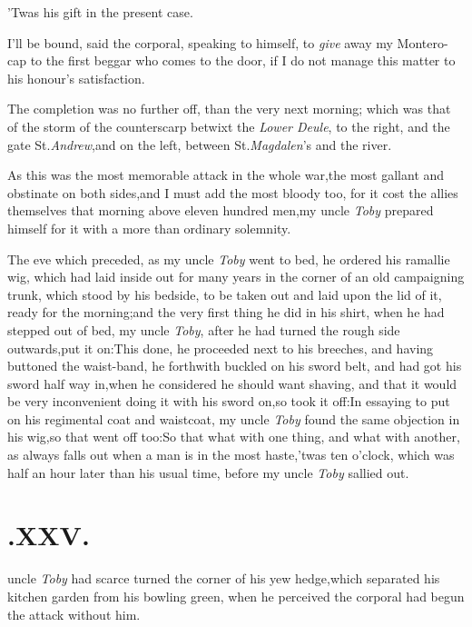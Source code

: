 \documentclass{article}
\begin{document}
\tsh ’Twas his gift in the present case.

I’ll be bound, said the corporal, speaking to himself, to
\textit{give} away my Montero-cap to the first beggar who comes to the door,
if I do not manage this matter to\break
his honour’s satisfaction.

The completion was no further off, than the very next morning; which was that of the
storm of the counterscarp betwixt the \textit{Lower Deule}, to the right, and the
gate St.\@ \textit{Andrew},\tsk and on the left, between St.\@ \textit{Magdalen}’s
and the river.

As this was the most memorable attack in the whole
war,\tsk the most gallant and obstinate on both sides,\tsk and
I must add the most bloody too, for it cost the allies themselves
that morning above eleven hundred men,\tsk my uncle \textit{Toby}
prepared himself for it with a more than ordinary solemnity.

The eve which preceded, as my uncle \textit{Toby} went to bed, he
ordered his ramallie wig, which had laid inside out for many years
in the corner of an old campaigning trunk, which stood by his
\setlength{\baselineskip}{13.3636pt}%
bedside, to be taken out and laid upon the lid of it, ready for the morning;\tsk and the
very first thing he did in his shirt, when he had stepped out of
bed, my uncle \textit{Toby}, after he had turned the rough side
outwards,\tsk put it on:\tsh\break This done, he proceeded
next to his breeches, and having buttoned the waist-band, he
forthwith buckled on his sword belt, and had got his sword half way
in,\break\tsk when he considered he should want shaving, and that it
would be very inconvenient doing it with his sword on,\tsk so
took it off:\tsh In essaying to put on his regimental coat
and waistcoat, my uncle \textit{Toby} found the same objection in his
wig,\tsk so that went off too:\tsk So that what with one thing,
and what with another, as always falls out when a man is in the
most haste,\tsk ’twas ten o’clock, which was half an
hour later than his usual time, before my uncle \textit{Toby} sallied
out.

\enlargethispage\baselineskip
\section{.\enspace XXV.}

 uncle \textit{Toby} had scarce
turned the corner of his yew hedge,\break which separated his
kitchen garden from his bowling green, when he perceived the
corporal had begun the attack without him.\tsh
\end{document}
